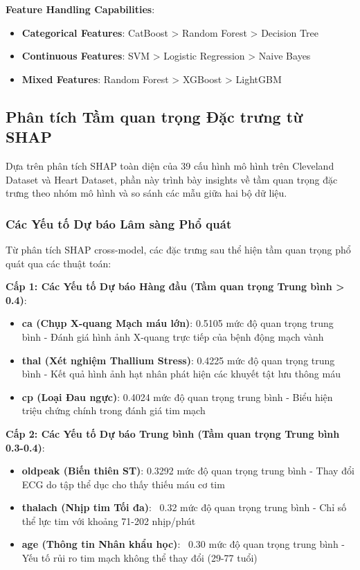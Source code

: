 \textbf{Feature Handling Capabilities}:
\begin{itemize}
    \item \textbf{Categorical Features}: CatBoost > Random Forest > Decision Tree
    \item \textbf{Continuous Features}: SVM > Logistic Regression > Naive Bayes
    \item \textbf{Mixed Features}: Random Forest > XGBoost > LightGBM
\end{itemize}

\subsection{Phân tích Tầm quan trọng Đặc trưng từ SHAP}\label{subsec:ra-feature-importance-analysis}

Dựa trên phân tích SHAP toàn diện của 39 cấu hình mô hình trên Cleveland Dataset và Heart Dataset, phần này trình bày insights về tầm quan trọng đặc trưng theo nhóm mô hình và so sánh các mẫu giữa hai bộ dữ liệu.

\subsubsection{Các Yếu tố Dự báo Lâm sàng Phổ quát}

Từ phân tích SHAP cross-model, các đặc trưng sau thể hiện tầm quan trọng phổ quát qua các thuật toán:

\textbf{Cấp 1: Các Yếu tố Dự báo Hàng đầu (Tầm quan trọng Trung bình > 0.4)}:
\begin{itemize}
    \item \textbf{ca (Chụp X-quang Mạch máu lớn)}: 0.5105 mức độ quan trọng trung bình - Đánh giá hình ảnh X-quang trực tiếp của bệnh động mạch vành
    \item \textbf{thal (Xét nghiệm Thallium Stress)}: 0.4225 mức độ quan trọng trung bình - Kết quả hình ảnh hạt nhân phát hiện các khuyết tật lưu thông máu  
    \item \textbf{cp (Loại Đau ngực)}: 0.4024 mức độ quan trọng trung bình - Biểu hiện triệu chứng chính trong đánh giá tim mạch
\end{itemize}

\textbf{Cấp 2: Các Yếu tố Dự báo Trung bình (Tầm quan trọng Trung bình 0.3-0.4)}:
\begin{itemize}
    \item \textbf{oldpeak (Biến thiên ST)}: 0.3292 mức độ quan trọng trung bình - Thay đổi ECG do tập thể dục cho thấy thiếu máu cơ tim
    \item \textbf{thalach (Nhịp tim Tối đa)}: ~0.32 mức độ quan trọng trung bình - Chỉ số thể lực tim với khoảng 71-202 nhịp/phút
    \item \textbf{age (Thông tin Nhân khẩu học)}: ~0.30 mức độ quan trọng trung bình - Yếu tố rủi ro tim mạch không thể thay đổi (29-77 tuổi)
\end{itemize}

